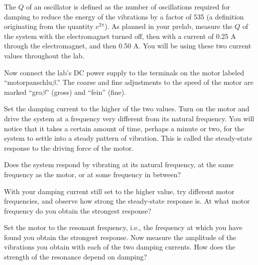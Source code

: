 The $Q$ of an oscillator is defined as the number of
oscillations required for damping to reduce the energy of
the vibrations by a factor of 535 (a definition originating
from the quantity $e^{2\pi}$). As planned in your prelab,
measure the $Q$ of the system with the electromagnet turned
off, then with a current of 0.25 A through the electromagnet,
and then 0.50 A. You will be using these two current
values throughout the lab.


Now connect the lab's DC power supply to the terminals on the
motor labeled ``motorpanschlu$\beta $.'' 
The coarse and fine adjustments to the speed of the
motor are marked ``gro$\beta $'' (gross) and ``fein'' (fine).

Set the damping current to the higher of the two values.
Turn on the motor and drive the system at a frequency very
different from its natural frequency. You will notice that
it takes a certain amount of time, perhaps a minute or two,
for the system to settle into a steady pattern of vibration.
This is called the steady-state response to the driving force of the motor.

Does the system respond by vibrating at its natural
frequency, at the same frequency as the motor, or at some
frequency in between?


With your damping current still set to the higher value, try
different motor frequencies, and observe how strong the
steady-state response is. At what motor frequency do you
obtain the strongest response?


Set the motor to the resonant frequency, i.e., the frequency
at which you have found you obtain the strongest response.
Now measure the amplitude of the vibrations you obtain with
each of the two damping currents. How does the strength of
the resonance depend on damping?


